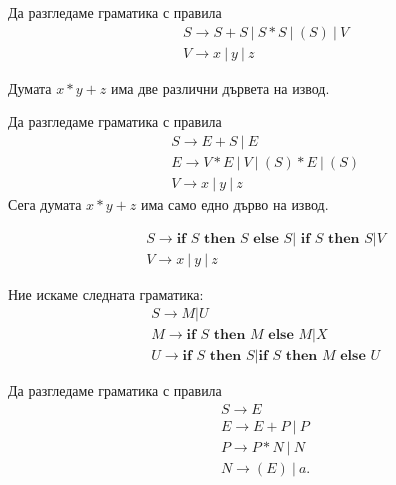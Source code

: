 \begin{example}
  Да разгледаме граматика с правила
  \begin{align*}
    & S \to S + S\ |\ S * S\ |\ (S)\ |\ V\\
    & V \to x\ |\ y\ |\ z
  \end{align*}

  Думата $x * y + z$ има две различни дървета на извод.

  Да разгледаме граматика с правила
  \begin{align*}
    & S \to E + S\ |\ E\\
    & E \to V * E\ |\ V\ |\ (S) * E\ |\ (S)\\
    & V \to x\ |\ y\ |\ z
  \end{align*}
  Сега думата $x * y + z$ има само едно дърво на извод.
\end{example}

\begin{example}
  \begin{align*}
    & S \to \textbf{if } S \textbf{ then } S \textbf{ else }S | \textbf{ if }S \textbf{ then }S | V\\
    & V \to x\ |\ y\ |\ z
  \end{align*}

  Ние искаме следната граматика:
  \begin{align*}
    & S \to M | U\\
    & M \to \textbf{if } S \textbf{ then } M \textbf{ else }M | X\\
    & U \to \textbf{if } S \textbf{ then } S | \textbf{if } S \textbf{ then } M \textbf{ else }U
  \end{align*}
\end{example}



\begin{example}
  Да разгледаме граматика с правила
  \begin{align*}
    & S \to E\\
    & E \to E + P\ |\ P\\
    & P \to P * N\ |\ N\\
    & N \to (E)\ |\ a.
  \end{align*}
\end{example}

